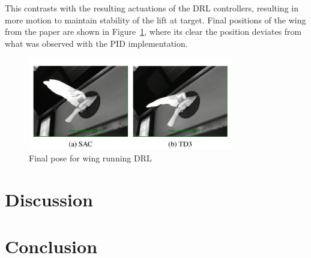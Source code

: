 This contrasts with the resulting actuations of the DRL controllers, resulting in more motion to maintain stability of the lift at target. Final positions of the wing from the paper are shown in Figure~\ref{fig:wing_DRL}, where its clear the position deviates from what was observed with the PID implementation.

\begin{figure}[h]
    \begin{center}
        \includegraphics[width=0.8\textwidth]{./img/wing_DRL.png}
    \end{center}
    \caption{Final pose for wing running DRL}\label{fig:wing_DRL}
\end{figure}


\section{Discussion}
\section{Conclusion}
